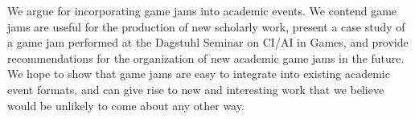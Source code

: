 \documentclass{acm_proc_article-sp}
\newcommand{\mytodo}[1]{\textbf{[[#1]]}}
\begin{document}
We argue for incorporating game jams into academic events.
We contend game jams are useful for the production of new scholarly work, present a case study of a game jam performed at the Dagstuhl Seminar on CI/AI in Games, and provide recommendations for the organization of new academic game jams in the future.
We hope to show that game jams are easy to integrate into existing academic event formats, and can give rise to new and interesting work that we believe would be unlikely to come about any other way.





\end{document}
